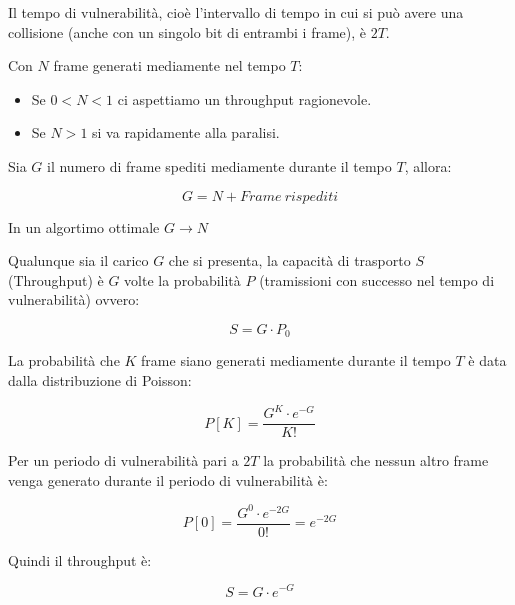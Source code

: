             Il tempo di vulnerabilità, cioè l'intervallo di tempo in cui si può avere una collisione (anche con un singolo bit di entrambi i frame), è $2T$.

            Con $N$ frame generati mediamente nel tempo $T$:
            \begin{itemize}
                \item Se $0 < N < 1$ ci aspettiamo un throughput ragionevole.
                \item Se $N > 1$ si va rapidamente alla paralisi.
            \end{itemize}

            Sia $G$ il numero di frame spediti mediamente durante il tempo $T$, allora:

            \begin{equation*}
                G = N + Frame ~ rispediti
            \end{equation*}

            In un algortimo ottimale $G \rightarrow N$

            Qualunque sia il carico $G$ che si presenta, la capacità di trasporto $S$ (Throughput) è $G$ volte la probabilità $P$ (tramissioni con successo nel tempo di vulnerabilità) ovvero:

            \begin{equation*}
                S = G \cdot P_0
            \end{equation*}

            La probabilità che $K$ frame siano generati mediamente durante il tempo $T$ è data dalla distribuzione di Poisson:

            \begin{equation*}
                P[K] = \frac{G^K \cdot e^{-G}}{K!}
            \end{equation*}

            Per un periodo di vulnerabilità pari a $2T$ la probabilità che nessun altro frame venga generato durante il periodo di vulnerabilità è:

            \begin{equation*}
                P[0] = \frac{G^0 \cdot e^{-2G}}{0!} = e^{-2G}
            \end{equation*}

            Quindi il throughput è:

            \begin{equation*}
                S = G \cdot e^{-G}
            \end{equation*}

